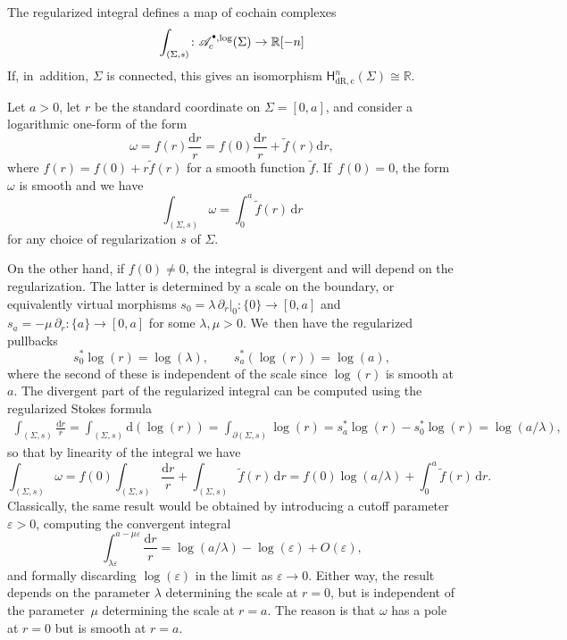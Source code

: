 \documentclass[10pt]{amsart}
\let\oldbullet\bullet
\renewcommand{\bullet}{{\raisebox{1pt}{$\scriptscriptstyle\oldbullet$}}}
\theoremstyle{definition}
\theoremstyle{remark}
\newenvironment{example}
  {\pushQED{\qed}\renewcommand{\qedsymbol}{$\lozenge$}\examplex}
  {\popQED\endexamplex}
\newcommand{\RR}{\mathbb{R}}
\newcommand{\tf}{\widetilde{f}}
\let\epsilon\varepsilon
\newcommand{\dd}{\mathrm{d}}
\newcommand{\dlog}[1]{\frac{\dd#1}{#1}}
\newcommand{\Alogc}[2][\bullet]{\mathscr{A}^{#1,\log}_c(#2)}
\newcommand{\cvf}[1]{\partial_{#1}}
\newcommand{\Sig}{\Sigma}
\newcommand{\HdRc}[2][\bullet]{\mathsf{H}_{\mathrm{dR},\mathrm{c}}^{#1}(#2)}
\begin{document}
\begin{corollary}
The regularized integral defines a map of cochain complexes
\[
\int_{(\Sig,s)} \colon \Alogc{\Sig} \to \RR[-n]
\]
If, in~addition, $\Sig$ is connected, this gives an isomorphism $\HdRc[n]{\Sig} \cong \RR.$
\end{corollary}

\begin{example}\label{ex:regint-interval}
Let $a>0$, let $r$ be the standard coordinate on $\Sig = [0,a]$, and consider a logarithmic one-form of the form
\[
\omega = f(r)\dlog{r} = f(0)\dlog{r} + \tf(r)\dd r,
\]
where $f(r) = f(0) + r \tf(r)$ for a smooth function $\tf$. If~$f(0)=0$, the form $\omega$ is smooth and we have
\[
\int_{(\Sig,s)} \omega = \int_0^a \tf(r)\,\dd r
\]
for any choice of regularization $s$ of $\Sig$.

On the other hand, if $f(0) \neq 0$, the integral is divergent and will depend on the regularization. The latter is determined by a scale on the boundary, or equivalently virtual morphisms $s_0 = \lambda\,\cvf{r}|_0 \colon \{0\} \to [0,a]$ and $s_a = -\mu\,\cvf{r}\colon \{a\} \to [0,a]$ for some $\lambda,\mu>0$. We~then have the regularized pullbacks
\[
s_0^* \log(r) = \log(\lambda),\qquad s_a^*(\log(r)) = \log(a),
\]
where the second of these is independent of the scale since $\log(r)$ is smooth at $a$.
The divergent part of the regularized integral can be computed using the regularized Stokes formula
\begin{align*}
\int_{(\Sig,s)} \dlog{r} = \int_{(\Sig,s)} \dd(\log(r))
= \int_{\partial(\Sig,s)} \log(r)
= s_a^*\log(r)-s_0^*\log(r)
= \log(a/\lambda),
\end{align*}
so that by linearity of the integral we have
\[
\int_{(\Sig,s)}\omega = f(0) \int_{(\Sig,s)} \dlog{r} + \int_{(\Sig,s)} \tf(r)\,\dd r = f(0) \log(a/\lambda) + \int_0^a \tf(r)\,\dd r.
\]
Classically, the same result would be obtained by introducing a cutoff parameter $\epsilon>0$, computing the convergent integral
\[
\int_{\lambda\epsilon}^{a-\mu\epsilon} \dlog{r} = \log(a/\lambda)-\log(\epsilon) + O(\epsilon),
\]
and formally discarding $\log(\epsilon)$ in the limit as $\epsilon\to 0$. Either way, the result depends on the parameter $\lambda$ determining the scale at $r=0$, but is independent of the parameter~$\mu$ determining the scale at $r=a$. The reason is that $\omega$ has a pole at $r=0$ but is smooth at $r=a$.
\end{example}
\end{document}
